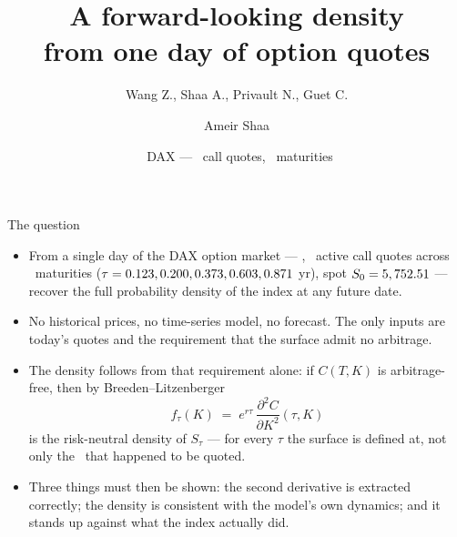 \documentclass[aspectratio=169,11pt]{beamer}
\title{A forward-looking density\\from one day of option quotes}
\subtitle{Wang Z., Shaa A., Privault N., Guet C.}
\author{Ameir Shaa}
\date{\FDdate\ DAX --- \FDnquotes\ call quotes, \FDnmat\ maturities}
\institute{One calibration, no historical prices, no forecasting model}
\newcommand{\gold}[1]{{\color{ntugold}#1}}
\newcommand{\red}[1]{{\color{ntured}#1}}
\begin{document}
\maketitle

\begin{frame}{The question}
  \small
  \begin{itemize}
    \item From a \gold{single day} of the DAX option market --- \FDdate, \FDnquotes\ active
          call quotes across \FDnmat\ maturities ($\tau=0.123, 0.200, 0.373, 0.603, 0.871$ yr), spot $S_0=5,752.51$
          --- recover the full \gold{probability density of the index at any future date}.
    \item No historical prices, no time-series model, no forecast. The only inputs are
          today's quotes and the requirement that the surface admit \gold{no arbitrage}.
    \item The density follows from that requirement alone: if $C(T,K)$ is arbitrage-free,
          then by Breeden--Litzenberger
          \[
            f_\tau(K) \;=\; e^{r\tau}\,\frac{\partial^2 C}{\partial K^2}(\tau,K)
          \]
          is the risk-neutral density of $S_\tau$ --- for \gold{every} $\tau$ the surface is
          defined at, not only the \FDnmat\ that happened to be quoted.
    \item \red{Three things must then be shown:} the second derivative is extracted
          correctly; the density is consistent with the model's own dynamics; and it stands
          up against what the index actually did.
  \end{itemize}
\end{frame}
\end{document}

